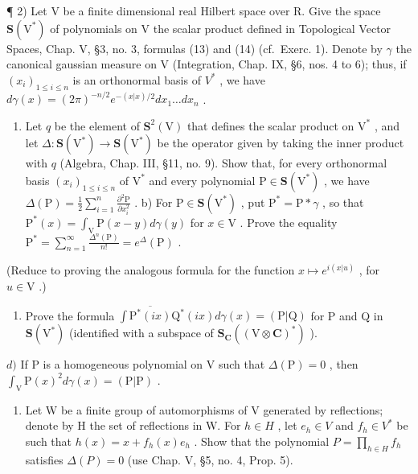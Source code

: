 \begin{enumerate}
¶ 2) Let V be a finite dimensional real Hilbert space over R. Give the space \(\mathbf{S}(\mathrm{V}^{*})\) of polynomials on V the scalar product defined in Topological Vector Spaces, Chap. V, §3, no. 3, formulas (13) and (14) (cf.~Exerc. 1). Denote by \(\gamma\) the canonical gaussian measure on V (Integration, Chap. IX, §6, nos. 4 to 6); thus, if \((x_{i})_{1\leq i\leq n}\) is an orthonormal basis of \(V^{*}\) , we have \(d\gamma(x)=(2\pi)^{-n/2}e^{-(x|x)/2}dx_{1}\ldots dx_{n}\) .

\begin{enumerate}
\def\labelenumi{\alph{enumi})}
\tightlist
\item
  Let \(q\) be the element of \(\mathbf{S}^2(\mathrm{V})\) that defines the scalar product on \(\mathrm{V}^*\) , and let \(\Delta: \mathbf{S}(\mathrm{V}^*) \to \mathbf{S}(\mathrm{V}^*)\) be the operator given by taking the inner product with \(q\) (Algebra, Chap. III, §11, no. 9). Show that, for every orthonormal basis \((x_i)_{1 \leq i \leq n}\) of \(\mathrm{V}^*\) and every polynomial \(\mathrm{P} \in \mathbf{S}(\mathrm{V}^*)\) , we have \(\Delta(\mathrm{P}) = \frac{1}{2} \sum_{i=1}^{n} \frac{\partial^2\mathrm{P}}{\partial x_i^2}\) . b) For \(\mathrm{P} \in \mathbf{S}(\mathrm{V}^*)\) , put \(\mathrm{P}^* = \mathrm{P} * \gamma\) , so that \(\mathrm{P}^*(x) = \int_{\mathrm{V}} \mathrm{P}(x - y) d\gamma(y)\) for \(x \in \mathrm{V}\) . Prove the equality \(\mathrm{P}^* = \sum_{n=1}^{\infty} \frac{\Delta^n(\mathrm{P})}{n!} = e^{\Delta}(\mathrm{P})\) .
\end{enumerate}

(Reduce to proving the analogous formula for the function \(x \mapsto e^{i(x|u)}\) , for \(u \in \mathrm{V}\) .)

\begin{enumerate}
\def\labelenumi{\alph{enumi})}
\setcounter{enumi}{2}
\tightlist
\item
  Prove the formula \(\int\overline{\mathrm{P}^{*}(ix)}\mathrm{Q}^{*}(ix)d\gamma(x)=(\mathrm{P}|\mathrm{Q})\) for P and Q in \(\mathbf{S}(\mathrm{V}^{*})\) (identified with a subspace of \(\mathbf{S}_{\mathbf{C}}((\mathrm{V}\otimes\mathbf{C})^{*})\) ).
\end{enumerate}

\(d)\) If \(\mathrm{P}\) is a homogeneous polynomial on \(\mathrm{V}\) such that \(\Delta (\mathrm{P}) = 0\) , then \(\int_{\mathrm{V}}\mathrm{P}(x)^2 d\gamma (x) = (\mathrm{P}|\mathrm{P})\) .

\begin{enumerate}
\def\labelenumi{\alph{enumi})}
\setcounter{enumi}{4}
\tightlist
\item
  Let W be a finite group of automorphisms of V generated by reflections; denote by H the set of reflections in W. For \(h \in H\) , let \(e_{h} \in V\) and \(f_{h} \in V^{*}\) be such that \(h(x) = x + f_{h}(x)e_{h}\) . Show that the polynomial \(P = \prod_{h \in H} f_{h}\) satisfies \(\Delta(P) = 0\) (use Chap. V, §5, no. 4, Prop. 5).
\end{enumerate}


\end{enumerate}
